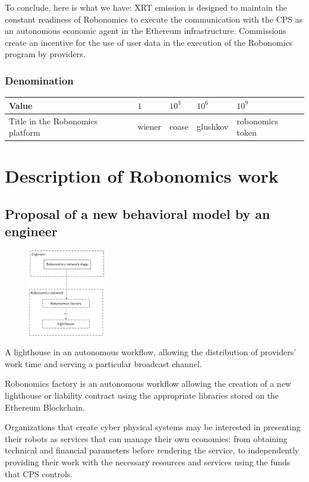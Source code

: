 \documentclass{article}
\begin{document}
To conclude, here is what we have: XRT emission is designed to maintain the constant readiness of Robonomics to execute the communication with the CPS as an autonomous economic agent in the Ethereum infrastructure. Commissions create an incentive for the use of user data in the execution of the Robonomics program by providers.

\subsubsection{Denomination }
\begin{tabular}{ l |l |l |l |l}
 Value &  $1$ & $10^3$ & $10^6$  & $10^9$ \\ 
 \hline
 Title in the Robonomics platform &  wiener & coase  & glushkov & robonomics token\\ 
\end{tabular}

\section{Description of Robonomics work}
\subsection{Proposal of a new behavioral model by an engineer}

\begin{figure} %
    \centering
    \includegraphics[width=0.30\textwidth]{step-by-step-1.png}
\end{figure}

A lighthouse in an autonomous workflow, allowing the distribution of providers' work time and serving a particular broadcast channel.

Robonomics factory is an autonomous workflow allowing the creation of a new lighthouse or liability contract using the appropriate libraries stored on the Ethereum Blockchain.

Organizations that create cyber physical systems may be interested in presenting their robots as services that can manage their own economies: from obtaining technical and financial parameters before rendering the service, to independently providing their work with the necessary resources and services using the funds that CPS controls.
\end{document}
